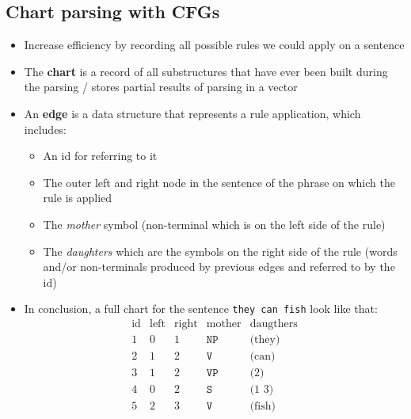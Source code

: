 \subsection{Chart parsing with CFGs}
\begin{itemize}
	\item Increase efficiency by recording all possible rules we could apply on a sentence
	\item The \textbf{chart} is a record of all substructures that have ever been built during the parsing / stores partial results of parsing in a vector
	\item An \textbf{edge} is a data structure that represents a rule application,   which includes:
	\begin{itemize}
		\item An id for referring to it
		\item The outer left and right node in the sentence of the phrase on which the rule is applied
		\item The \textit{mother} symbol (non-terminal which is on the left side of the rule)
		\item The \textit{daughters} which are the symbols on the right side of the rule (words and/or non-terminals produced by previous edges and referred to by the id)
	\end{itemize}
	\item In conclusion, a full chart for the sentence \texttt{they can fish} look like that:
	$$\begin{array}{ccccc}
	\text{id} & \text{left} & \text{right} & \text{mother} & \text{daugthers}\\
	\hline
	1 & 0 & 1 & \texttt{NP} & \text{(they)}\\
	2 & 1 & 2 & \texttt{V} & \text{(can)}\\
	3 & 1 & 2 & \texttt{VP} & \text{(2)}\\
	4 & 0 & 2 & \texttt{S} & \text{(1 3)}\\
	5 & 2 & 3 & \texttt{V} & \text{(fish)}\\

\end{array}$$
\end{itemize}
